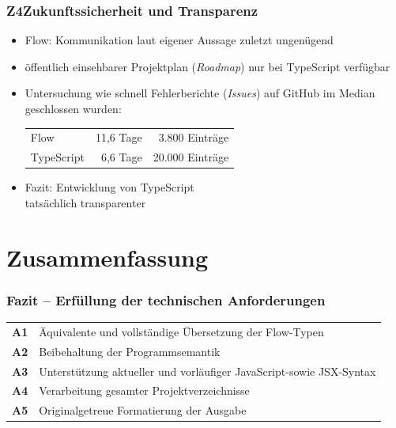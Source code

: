       \begin{frame}
        \frametitle{Z4\hspace{0.75em}Zukunftssicherheit und Transparenz}
        \begin{itemize}
          \item Flow: Kommunikation laut eigener Aussage zuletzt ungenügend~\autocite{FLOW:UPDATE_2019}
          \item öffentlich einsehbarer Projektplan (\textit{Roadmap}) nur bei TypeScript verfügbar
          \item Untersuchung wie schnell Fehlerberichte (\textit{Issues}) auf GitHub im Median geschlossen wurden:\\
            \vspace{.5em}
            {
              \footnotesize
              \begin{tabu}{@{}lrr@{}}
                Flow & 11,6 Tage & 3.800 Einträge \\
                TypeScript & 6,6 Tage & 20.000 Einträge \\
              \end{tabu}
            }
          \item Fazit: Entwicklung von TypeScript\\tatsächlich transparenter
        \end{itemize}
      \end{frame}

  \section{Zusammenfassung}

    \begin{frame}
      \frametitle{Fazit -- Erfüllung der technischen Anforderungen}
      {
        \renewcommand{\arraystretch}{1.75}
        \begin{tabu} to 
          \textbf{A1} & Äquivalente und vollständige Übersetzung der Flow-Typen \\
          \textbf{A2} & Beibehaltung der Programmsemantik \\
          \textbf{A3} & Unterstützung aktueller und vorläufiger JavaScript-\newline sowie JSX-Syntax \\
          \textbf{A4} & Verarbeitung gesamter Projektverzeichnisse \\
          \textbf{A5} & Originalgetreue Formatierung der Ausgabe \\
        \end{tabu}
      }
    \end{frame}

